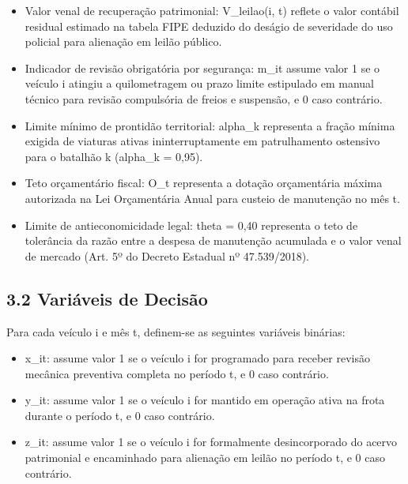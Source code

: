 \documentclass[10pt,a4paper,journal]{article}
\begin{document}
\begin{itemize}
\item Valor venal de recuperação patrimonial: V\_leilao(i, t) reflete o valor contábil residual estimado na tabela FIPE deduzido do deságio de severidade do uso policial para alienação em leilão público.
\end{itemize}
\begin{itemize}
\item Indicador de revisão obrigatória por segurança: m\_it assume valor 1 se o veículo i atingiu a quilometragem ou prazo limite estipulado em manual técnico para revisão compulsória de freios e suspensão, e 0 caso contrário.
\end{itemize}
\begin{itemize}
\item Limite mínimo de prontidão territorial: alpha\_k representa a fração mínima exigida de viaturas ativas ininterruptamente em patrulhamento ostensivo para o batalhão k (alpha\_k = 0,95).
\end{itemize}
\begin{itemize}
\item Teto orçamentário fiscal: O\_t representa a dotação orçamentária máxima autorizada na Lei Orçamentária Anual para custeio de manutenção no mês t.
\end{itemize}
\begin{itemize}
\item Limite de antieconomicidade legal: theta = 0,40 representa o teto de tolerância da razão entre a despesa de manutenção acumulada e o valor venal de mercado (Art. 5º do Decreto Estadual nº 47.539/2018).
\end{itemize}
\subsection{3.2 Variáveis de Decisão}
Para cada veículo i e mês t, definem-se as seguintes variáveis binárias:

\begin{itemize}
\item x\_it: assume valor 1 se o veículo i for programado para receber revisão mecânica preventiva completa no período t, e 0 caso contrário.
\end{itemize}
\begin{itemize}
\item y\_it: assume valor 1 se o veículo i for mantido em operação ativa na frota durante o período t, e 0 caso contrário.
\end{itemize}
\begin{itemize}
\item z\_it: assume valor 1 se o veículo i for formalmente desincorporado do acervo patrimonial e encaminhado para alienação em leilão no período t, e 0 caso contrário.
\end{itemize}
\end{document}
